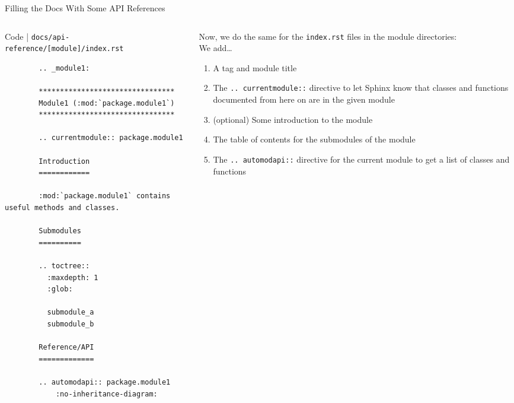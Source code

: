 \begin{frame}[fragile]{Filling the Docs With Some API References}

  \begin{columns}[onlytextwidth]
    \begin{column}{0.52\textwidth}
      \begin{block}{Code | \texttt{docs/api-reference/[module]/index.rst}}
      \scriptsize
      \begin{verbatim}
        .. _module1:

        ********************************
        Module1 (:mod:`package.module1`)
        ********************************

        .. currentmodule:: package.module1

        Introduction
        ============

        :mod:`package.module1` contains useful methods and classes.

        Submodules
        ==========

        .. toctree::
          :maxdepth: 1
          :glob:

          submodule_a
          submodule_b

        Reference/API
        =============

        .. automodapi:: package.module1
            :no-inheritance-diagram:
      \end{verbatim}
      \end{block}
    \end{column}
    \hfill
    \begin{column}{0.46\textwidth}
      Now, we do the same for the \texttt{index.rst} files in the module directories:\\[1em]
      We add\dots
      \begin{enumerate}
        \setlength{\itemsep}{1.5em}
        \item A tag and module title
        \item The \texttt{.. currentmodule::} directive to let Sphinx know that
          classes and functions documented from here on are in the given module
        \item (optional) Some introduction to the module
        \item The table of contents for the submodules of the module
        \item The \texttt{.. automodapi::} directive for the current module to get a list of
          classes and functions
      \end{enumerate}
    \end{column}
  \end{columns}
\end{frame}

